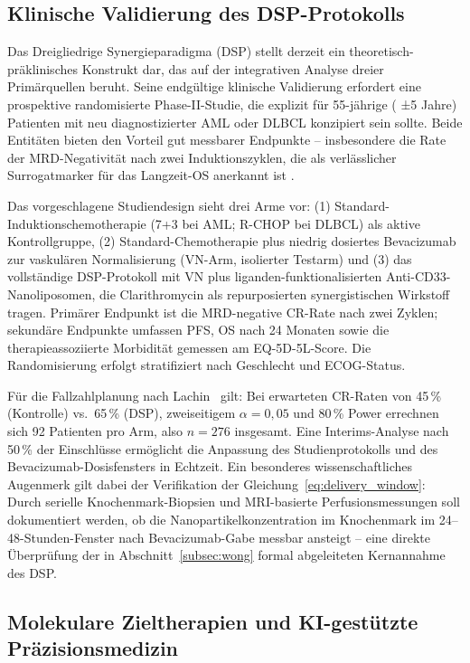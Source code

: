 ﻿\documentclass[12pt,a4paper]{article}
\theoremstyle{definition}
\begin{document}
\subsection{Klinische Validierung des DSP-Protokolls}

Das Dreigliedrige Synergieparadigma (DSP) stellt derzeit ein theoretisch-präklinisches
Konstrukt dar, das auf der integrativen Analyse dreier Primärquellen beruht.
Seine endgültige klinische Validierung erfordert eine prospektive randomisierte
Phase-II-Studie, die explizit für 55-jährige ( ±5 Jahre) Patienten mit neu
diagnostizierter AML oder DLBCL konzipiert sein sollte. Beide Entitäten bieten
den Vorteil gut messbarer Endpunkte -- insbesondere die Rate der MRD-Negativität
nach zwei Induktionszyklen, die als verlässlicher Surrogatmarker für das
Langzeit-OS anerkannt ist \cite{dohner2017}.

Das vorgeschlagene Studiendesign sieht drei Arme vor: (1) Standard-Induktionschemothera\-pie
(7+3 bei AML; R-CHOP bei DLBCL) als aktive Kontrollgruppe, (2) Standard-Chemotherapie
plus niedrig dosiertes Bevacizumab zur vaskulären Normalisierung (VN-Arm, isolierter
Testarm) und (3) das vollständige DSP-Protokoll mit VN plus liganden-funktionalisierten
Anti-CD33-Nanoliposomen, die Clarithromycin als repurposierten synergistischen Wirkstoff
tragen. Primärer Endpunkt ist die MRD-negative CR-Rate nach zwei Zyklen; sekundäre
Endpunkte umfassen PFS, OS nach 24 Monaten sowie die therapieassoziierte Morbidität
gemessen am EQ-5D-5L-Score. Die Randomisierung erfolgt stratifiziert nach Geschlecht
und ECOG-Status.

Für die Fallzahlplanung nach Lachin~\cite{lachin1981} gilt: Bei erwarteten CR-Raten von
45\,\% (Kontrolle) vs.~65\,\% (DSP), zweiseitigem $\alpha=0{,}05$ und 80\,\% Power
errechnen sich 92 Patienten pro Arm, also $n=276$ insgesamt. Eine Interims-Analyse
nach 50\,\% der Einschlüsse ermöglicht die Anpassung des Studienprotokolls und des
Bevacizumab-Dosisfensters in Echtzeit. Ein besonderes wissenschaftliches Augenmerk
gilt dabei der Verifikation der Gleichung~\eqref{eq:delivery_window}: Durch serielle
Knochenmark-Biopsien und MRI-basierte Perfusionsmessungen soll dokumentiert werden,
ob die Nanopartikelkonzentration im Knochenmark im 24--48-Stunden-Fenster nach
Bevacizumab-Gabe messbar ansteigt -- eine direkte Überprüfung der in Abschnitt~\ref{subsec:wong}
formal abgeleiteten Kernannahme des DSP.

\subsection{Molekulare Zieltherapien und KI-gestützte Präzisionsmedizin}
\end{document}
